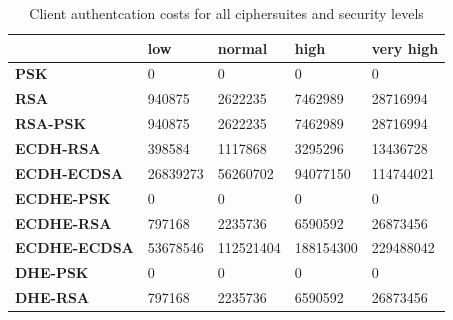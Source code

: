 \documentclass{llncs}
\begin{document}
\begin{table}[]
  \begin{tabular}{|l|l|l|l|l|}
  \hline
                       & \textbf{low} & \textbf{normal} & \textbf{high} & \textbf{very high} \\ \hline
  \textbf{PSK}         & 0            & 0               & 0             & 0                  \\ \hline
  \textbf{RSA}         & 940875       & 2622235         & 7462989       & 28716994           \\ \hline
  \textbf{RSA-PSK}     & 940875       & 2622235         & 7462989       & 28716994           \\ \hline
  \textbf{ECDH-RSA}    & 398584       & 1117868         & 3295296       & 13436728           \\ \hline
  \textbf{ECDH-ECDSA}  & 26839273     & 56260702        & 94077150      & 114744021          \\ \hline
  \textbf{ECDHE-PSK}   & 0            & 0               & 0             & 0                  \\ \hline
  \textbf{ECDHE-RSA}   & 797168       & 2235736         & 6590592       & 26873456           \\ \hline
  \textbf{ECDHE-ECDSA} & 53678546     & 112521404       & 188154300     & 229488042          \\ \hline
  \textbf{DHE-PSK}     & 0            & 0               & 0             & 0                  \\ \hline
  \textbf{DHE-RSA}     & 797168       & 2235736         & 6590592       & 26873456           \\ \hline
  \end{tabular}
  \centering \caption{\label{table:tls-auth-cost-client} Client authentcation costs for all ciphersuites and security levels}
  \end{table}
\end{document}
